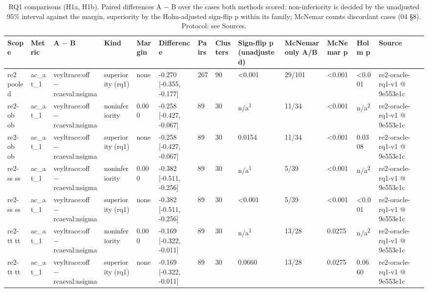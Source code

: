 \begin{table}[t]
\centering
\caption{RQ1 comparisons (H1a, H1b). Paired differences A $-$ B over the cases both methods scored: non-inferiority is decided by the unadjusted 95\% interval against the margin, superiority by the Holm-adjusted sign-flip p within its family; McNemar counts discordant cases (04 \S{}8). Protocol: see Sources.}
\label{tab:t05c-rq1-comparisons}
\small
\begin{tabular}{lllllllllllll}
\hline
Scope & Metric & A $-$ B & Kind & Margin & Difference & Pairs & Clusters & Sign-flip p (unadjusted) & McNemar only A/B & McNemar p & Holm p & Source \\
\hline
re2 pooled & ac\_at\_1 & veyltrace:off $-$ rcaeval:nsigma & superiority (rq1) & none & -0.270 [-0.355, -0.177] & 267 & 90 & \textless{}0.001 & 29/101 & \textless{}0.001 & \textless{}0.001 & re2-oracle-rq1-v1 @ 9e553e1c \\
re2-ob ob & ac\_at\_1 & veyltrace:off $-$ rcaeval:nsigma & noninferiority & 0.000 & -0.258 [-0.427, -0.067] & 89 & 30 & n/a\textsuperscript{1} & 11/34 & \textless{}0.001 & n/a\textsuperscript{2} & re2-oracle-rq1-v1 @ 9e553e1c \\
re2-ob ob & ac\_at\_1 & veyltrace:off $-$ rcaeval:nsigma & superiority (rq1) & none & -0.258 [-0.427, -0.067] & 89 & 30 & 0.0154 & 11/34 & \textless{}0.001 & 0.0308 & re2-oracle-rq1-v1 @ 9e553e1c \\
re2-ss ss & ac\_at\_1 & veyltrace:off $-$ rcaeval:nsigma & noninferiority & 0.000 & -0.382 [-0.511, -0.256] & 89 & 30 & n/a\textsuperscript{1} & 5/39 & \textless{}0.001 & n/a\textsuperscript{2} & re2-oracle-rq1-v1 @ 9e553e1c \\
re2-ss ss & ac\_at\_1 & veyltrace:off $-$ rcaeval:nsigma & superiority (rq1) & none & -0.382 [-0.511, -0.256] & 89 & 30 & \textless{}0.001 & 5/39 & \textless{}0.001 & \textless{}0.001 & re2-oracle-rq1-v1 @ 9e553e1c \\
re2-tt tt & ac\_at\_1 & veyltrace:off $-$ rcaeval:nsigma & noninferiority & 0.000 & -0.169 [-0.322, -0.011] & 89 & 30 & n/a\textsuperscript{1} & 13/28 & 0.0275 & n/a\textsuperscript{2} & re2-oracle-rq1-v1 @ 9e553e1c \\
re2-tt tt & ac\_at\_1 & veyltrace:off $-$ rcaeval:nsigma & superiority (rq1) & none & -0.169 [-0.322, -0.011] & 89 & 30 & 0.0660 & 13/28 & 0.0275 & 0.0660 & re2-oracle-rq1-v1 @ 9e553e1c \\
\hline
\end{tabular}

\end{table}
